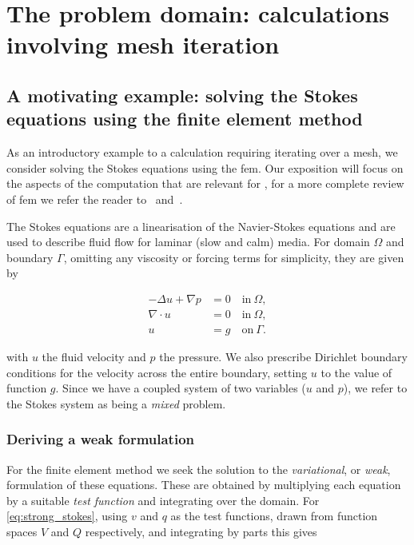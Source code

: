 \documentclass[thesis]{subfiles}
\begin{document}
\section{The problem domain: calculations involving mesh iteration}

\subsection{A motivating example: solving the Stokes equations using the finite element method}

As an introductory example to a calculation requiring iterating over a mesh, we consider solving the Stokes equations using the \gls{fem}.
Our exposition will focus on the aspects of the computation that are relevant for , for a more complete review of \gls{fem} we refer the reader to~\cite{brennerMathematicalTheoryFinite2008} and~\cite{larsonFiniteElementMethod2013}.

The Stokes equations are a linearisation of the Navier-Stokes equations and are used to describe fluid flow for laminar (slow and calm) media.
For domain $\Omega$ and boundary $\Gamma$, omitting any viscosity or forcing terms for simplicity, they are given by

\begin{subequations}
  \begin{align}
    - \Delta u + \nabla p &= 0 \quad \textrm{in} \ \Omega, \\
    \nabla \cdot u &= 0 \quad \textrm{in} \ \Omega, \\
    u &= g \quad \textrm{on} \ \Gamma.
  \end{align}
  \label{eq:strong_stokes}
\end{subequations}

with $u$ the fluid velocity and $p$ the pressure.
We also prescribe Dirichlet boundary conditions for the velocity across the entire boundary, setting $u$ to the value of function $g$.
Since we have a coupled system of two variables ($u$ and $p$), we refer to the Stokes system as being a \textit{mixed} problem.

\subsubsection{Deriving a weak formulation}


For the finite element method we seek the solution to the \textit{variational}, or \textit{weak}, formulation of these equations.
These are obtained by multiplying each equation by a suitable \textit{test function} and integrating over the domain.
For \cref{eq:strong_stokes}, using $v$ and $q$ as the test functions, drawn from function spaces $\hat V$ and $Q$ respectively, and integrating by parts this gives
\end{document}
